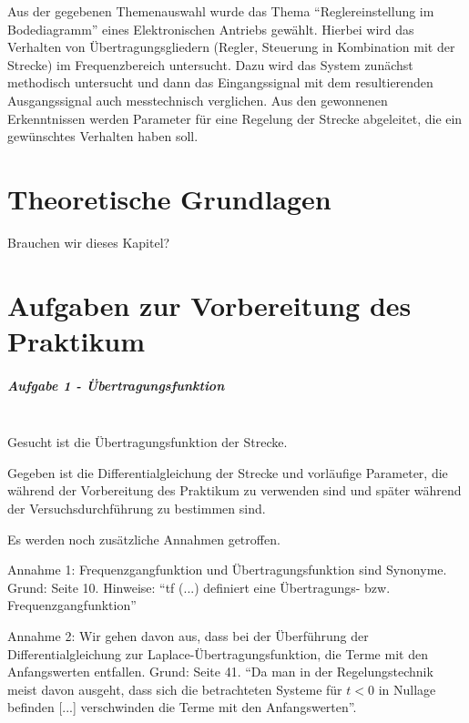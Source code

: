 \documentclass[            %
draft = false,             		%
paper = A4,                		%
pagesize = pdftex,         		%
fontsize = 10pt,           		%
DIV=15,                    		%
twoside = false,           		%
twocolumn = false,         		%
parskip = full,           		%
chapterprefix = false,      		%
appendixprefix = true,     		%
headinclude = false,       		%
footinclude = false,       		%
mpinclude = false,         		%
numbers = auto,            		%
cleardoublepage = plain,   		%
footnotes = multiple,      		%
titlepage = true,          		%
headings = normal,         		%
open = right,              		%
bibliography = openstyle,  		%
listof = chaptergapline,   		%
overfullrule = true,
]{scrbook}
\begin{document}
Aus der gegebenen Themenauswahl wurde das Thema ``Reglereinstellung im Bodediagramm'' eines Elektronischen Antriebs gewählt. 
Hierbei wird das Verhalten von Übertragungsgliedern (Regler, Steuerung in Kombination mit der Strecke) im Frequenzbereich untersucht.
Dazu wird das System zunächst methodisch untersucht und dann das Eingangssignal mit dem resultierenden Ausgangssignal auch messtechnisch verglichen.
Aus den gewonnenen Erkenntnissen werden Parameter für eine Regelung der Strecke abgeleitet, die ein gewünschtes Verhalten haben soll.


\newpage
{\let\clearpage\relax \chapter{Theoretische Grundlagen}} \label{chpt:Theory}

Brauchen wir dieses Kapitel?







{\let\clearpage\relax \chapter{Aufgaben zur Vorbereitung des Praktikum}} \label{chpt:Experiments}


\paragraph{Aufgabe 1 - Übertragungsfunktion}~\\

Gesucht ist die Übertragungsfunktion der Strecke.

Gegeben ist die Differentialgleichung der Strecke und vorläufige Parameter, die während der Vorbereitung des Praktikum zu verwenden sind und
später während der Versuchsdurchführung zu bestimmen sind.

Es werden noch zusätzliche Annahmen getroffen.

Annahme 1: Frequenzgangfunktion und Übertragungsfunktion sind Synonyme.
Grund: \cite{versuchssanleitung} Seite 10. Hinweise: ``tf (...) definiert eine Übertragungs- bzw. Frequenzgangfunktion''

Annahme 2: Wir gehen davon aus, dass bei der Überführung der Differentialgleichung zur Laplace-Übertragungsfunktion, die Terme mit den Anfangswerten entfallen.
Grund: \cite{Skript_Signalverarbeitung} Seite 41. ``Da man in der Regelungstechnik meist davon ausgeht, dass sich die betrachteten Systeme für $t < 0$ 
in Nullage befinden [...] verschwinden die Terme mit den Anfangswerten''.
\end{document}
